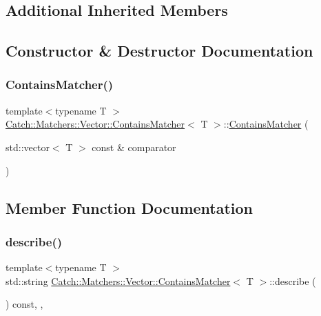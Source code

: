 \subsection*{Additional Inherited Members}


\subsection{Constructor \& Destructor Documentation}
\mbox{\label{struct_catch_1_1_matchers_1_1_vector_1_1_contains_matcher_ad8e92c8399be6dce75bb5702cdfab700}} 
\subsubsection{\texorpdfstring{ContainsMatcher()}{ContainsMatcher()}}
{\footnotesize\ttfamily template$<$typename T $>$ \\
\mbox{\hyperlink{struct_catch_1_1_matchers_1_1_vector_1_1_contains_matcher}{Catch\+::\+Matchers\+::\+Vector\+::\+Contains\+Matcher}}$<$ T $>$\+::\mbox{\hyperlink{struct_catch_1_1_matchers_1_1_vector_1_1_contains_matcher}{Contains\+Matcher}} (\begin{DoxyParamCaption}\item[{std\+::vector$<$ T $>$ const \&}]{comparator }\end{DoxyParamCaption})\hspace{0.3cm}{\ttfamily [inline]}}



\subsection{Member Function Documentation}
\mbox{\label{struct_catch_1_1_matchers_1_1_vector_1_1_contains_matcher_abe6a9ea3d6506c9a1f75ff524f35832e}} 
\subsubsection{\texorpdfstring{describe()}{describe()}}
{\footnotesize\ttfamily template$<$typename T $>$ \\
std\+::string \mbox{\hyperlink{struct_catch_1_1_matchers_1_1_vector_1_1_contains_matcher}{Catch\+::\+Matchers\+::\+Vector\+::\+Contains\+Matcher}}$<$ T $>$\+::describe (\begin{DoxyParamCaption}{ }\end{DoxyParamCaption}) const\hspace{0.3cm}{\ttfamily [inline]}, {\ttfamily [override]}, {\ttfamily [virtual]}}



